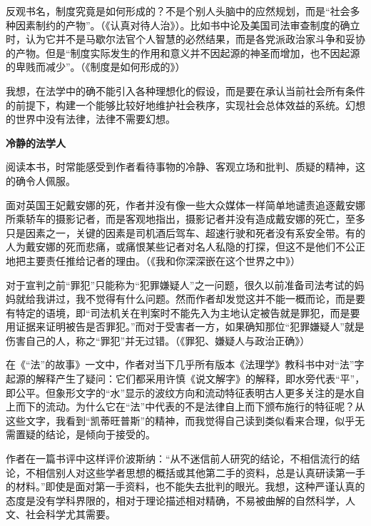 \par 反观书名，制度究竟是如何形成的？不是个别人头脑中的应然规划，而是“社会多种因素制约的产物”。（《认真对待人治》）。比如书中论及美国司法审查制度的确立时，认为它并不是马歇尔法官个人智慧的必然结果，而是各党派政治家斗争和妥协的产物。但是“制度实际发生的作用和意义并不因起源的神圣而增加，也不因起源的卑贱而减少”。（《制度是如何形成的》）
\par 我想，在法学中的确不能引入各种理想化的假设，而是要在承认当前社会所有条件的前提下，构建一个能够比较好地维护社会秩序，实现社会总体效益的系统。幻想的世界中没有法律，法律不需要幻想。
\par \textbf{冷静的法学人}
\par 阅读本书，时常能感受到作者看待事物的冷静、客观立场和批判、质疑的精神，这的确令人佩服。
\par 面对英国王妃戴安娜的死，作者并没有像一些大众媒体一样简单地谴责追逐戴安娜所乘轿车的摄影记者，而是客观地指出，摄影记者并没有造成戴安娜的死亡，至多只是因素之一，关键的因素是司机酒后驾车、超速行驶和死者没有系安全带。有的人为戴安娜的死而悲痛，或痛恨某些记者对名人私隐的打探，但这不是他们不公正地把主要责任推给记者的理由。（《我和你深深嵌在这个世界之中》）
\par 对于宣判之前“罪犯”只能称为“犯罪嫌疑人”之一问题，很久以前准备司法考试的妈妈就给我讲过，我不觉得有什么问题。然而作者却发觉这并不能一概而论，而是要有特定的语境，即“司法机关在判案时不能先入为主地认定被告就是罪犯，而是要用证据来证明被告是否罪犯。”而对于受害者一方，如果确知那位“犯罪嫌疑人”就是伤害自己的人，称之“罪犯”并无过错。（《罪犯、嫌疑人与政治正确》）
\par 在《“法”的故事》一文中，作者对当下几乎所有版本《法理学》教科书中对“法”字起源的解释产生了疑问：它们都采用许慎《说文解字》的解释，即水旁代表“平”，即公平。但象形文字的“水”显示的波纹方向和流动特征表明古人更多关注的是水自上而下的流动。为什么它在“法”中代表的不是法律自上而下颁布施行的特征呢？从这些文字，我看到“凯蒂旺普斯”的精神，而我觉得自己读到类似看来合理，似乎无需置疑的结论，是倾向于接受的。
\par 作者在一篇书评中这样评价波斯纳：“从不迷信前人研究的结论，不相信流行的结论，不相信别人对这些学者思想的概括或其他第二手的资料，总是认真研读第一手的材料。”即使是面对第一手资料，也不能失去批判的眼光。我想，这种严谨认真的态度是没有学科界限的，相对于理论描述相对精确，不易被曲解的自然科学，人文、社会科学尤其需要。
\par {}

